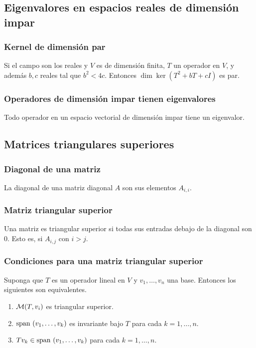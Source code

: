\documentclass{article}
\begin{document}
\subsection{Eigenvalores en espacios reales de dimensión impar}
\subsubsection*{Kernel de dimensión par}
Si el campo son los reales y $V$ es de dimensión finita,
$T$ un operador en $V$, y además $b,c$ reales tal que 
$b^2<4c$. Entonces $\dim\ker (T^2+bT+cI)$ es par.

\subsubsection{Operadores de dimensión impar tienen eigenvalores}
Todo operador en un espacio vectorial de dimensión impar
tiene un eigenvalor.

\subsection{Matrices triangulares superiores}
\subsubsection{Diagonal de una matriz}
La diagonal de una matriz diagonal $A$ son sus elementos
$A_{i,i}$.

\subsubsection{Matriz triangular superior}
Una matriz es triangular superior si todas sus entradas
debajo de la diagonal son $0$. Esto es, si $A_{i,j}$
con $i>j$.

\subsubsection{Condiciones para una matriz triangular superior}
Suponga que $T$ es un operador lineal en $V$ y $v_1,\ldots,v_n$
una base.
Entonces los siguientes son equivalentes.
\begin{enumerate}
    \item $\mathcal{M}(T,v_i)$ es triangular superior.
    \item $\text{span }(v_1,\ldots,v_k)$ es invariante bajo $T$ para 
    cada $k=1,\ldots,n$.
    \item $Tv_k\in\text{span }(v_1,\ldots, v_k)$ para cada
    $k=1,\ldots,n$.
\end{enumerate}
\end{document}
